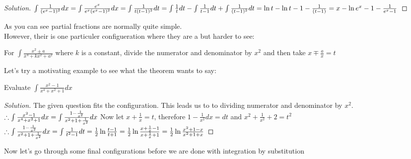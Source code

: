 \begin{proof}
    [Solution]
    $\int \frac{1}{(e^x-1)^2}dx\\
    =\int \frac{e^x}{e^x(e^x-1)^2}dx\\
    =\int \frac{1}{t(t-1)^2}dt\\ 
    =\int \frac{1}{t}dt - \int \frac{1}{t-1} dt + \int \frac{1}{(t-1)^2}dt\\
    = \ln{t} - \ln{t-1} - \frac{1}{(t-1)}\\
    = x-\ln{e^x-1}-\frac{1}{e^x-1}\\
    $
\end{proof}
As you can see partial fractions are normally quite simple.\\
However, their is one particuler configueration where they are a but harder to see:\\
\begin{theorem}
    For $\int \frac{x^2\pm a}{x^4+kx^2+a^2}$ where $k$ is a constant, divide the numerator and denominator by $x^2$ and then take $x \mp \frac{a}{x}=t$\\
\end{theorem}
Let's try a motivating example to see what the theorem wants to say:\\
\begin{example}
    Evaluate $\int \frac{x^2-1}{x^4+x^2+1} dx$
\end{example}
\begin{proof}
    [Solution]
    The given question fits the configuration. This leads us to to dividing numerator and denominator by $x^2$.\\
    $\therefore \int \frac{x^2-1}{x^4+x^2+1} dx\\
    = \int \frac{1-\frac{1}{x^2}}{x^2+1+\frac{1}{x^2}} dx$
    Now let $x+\frac{1}{x}=t$, therefore $1-\frac{1}{x^2}dx=dt$ and $x^2+\frac{1}{x^2}+2=t^2$\\
    $\therefore \int \frac{1-\frac{1}{x^2}}{x^2+1+\frac{1}{x^2}} dx
    = \int \frac{1}{t^2-1} dt\\
    = \frac{1}{2}\ln{\frac{t-1}{t+1}}\\
    = \frac{1}{2}\ln{\frac{x+\frac{1}{x}-1}{x+\frac{1}{x}+1}}\\
    = \frac{1}{2}\ln{\frac{x^2+1-x}{x^2+1+x}}
    $
\end{proof}
Now let's go through some final configurations before we are done with integration by substitution\\
